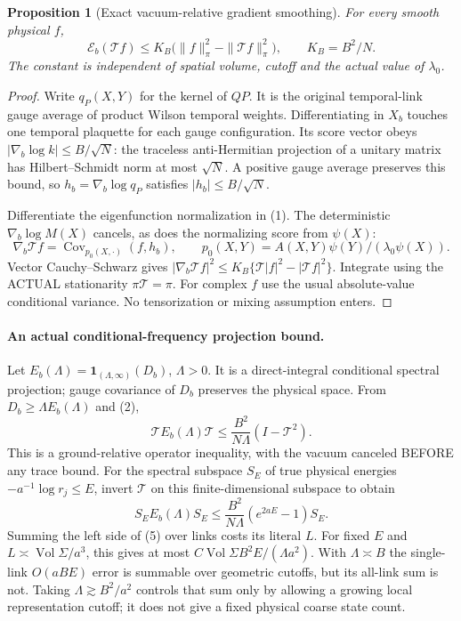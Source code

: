 \documentclass[11pt]{article}
\newtheorem{proposition}{Proposition}
\begin{document}
\begin{proposition}[Exact vacuum-relative gradient smoothing]
For every smooth physical $f$,
\[
 \mathcal E_b(\mathcal T f)
 \le K_B\big(\|f\|_\pi^2-\|\mathcal T f\|_\pi^2\big),
 \qquad K_B=B^2/N.                                    \tag{2}
\]
The constant is independent of spatial volume, cutoff and the actual value of
$\lambda_0$.
\end{proposition}
\begin{proof}
Write $q_P(X,Y)$ for the kernel of $QP$. It is the original temporal-link gauge
average of product Wilson temporal weights. Differentiating in $X_b$ touches
one temporal plaquette for each gauge configuration. Its score vector obeys
$|\nabla_b\log k|\le B/\sqrt N$: the traceless anti-Hermitian projection of a
unitary matrix has Hilbert--Schmidt norm at most $\sqrt N$.
A positive gauge average preserves this bound, so
$h_b=\nabla_b\log q_P$ satisfies $|h_b|\le B/\sqrt N$.

Differentiate the eigenfunction normalization in (1). The deterministic
$\nabla_b\log M(X)$ cancels, as does the normalizing score from $\psi(X)$:
\[
 \nabla_b\mathcal T f
 =\operatorname{Cov}_{p_0(X,\cdot)}(f,h_b),\qquad
 p_0(X,Y)=A(X,Y)\psi(Y)/(\lambda_0\psi(X)).             \tag{3}
\]
Vector Cauchy--Schwarz gives
$|\nabla_b\mathcal T f|^2\le K_B\{\mathcal T|f|^2-|\mathcal T f|^2\}$.
Integrate using the ACTUAL stationarity $\pi\mathcal T=\pi$.
For complex $f$ use the usual absolute-value conditional variance.
No tensorization or mixing assumption enters.
\end{proof}

\paragraph{An actual conditional-frequency projection bound.}
Let $E_b(\Lambda)=\boldsymbol1_{(\Lambda,\infty)}(D_b)$, $\Lambda>0$.
It is a direct-integral conditional spectral projection; gauge covariance of
$D_b$ preserves the physical space. From $D_b\ge\Lambda E_b(\Lambda)$ and (2),
\[
 \boxed{\quad
 \mathcal T E_b(\Lambda)\mathcal T
       \le\frac{B^2}{N\Lambda}(I-\mathcal T^2).
 \quad}                                               \tag{4}
\]
This is a ground-relative operator inequality, with the vacuum canceled BEFORE
any trace bound. For the spectral subspace $S_E$ of true physical energies
$-a^{-1}\log r_j\le E$, invert $\mathcal T$ on this finite-dimensional subspace
to obtain
\[
 S_E E_b(\Lambda)S_E
 \le\frac{B^2}{N\Lambda}(e^{2aE}-1)S_E.               \tag{5}
\]
Summing the left side of (5) over links costs its literal $L$. For fixed $E$
and $L\asymp\operatorname{Vol}\Sigma/a^3$, this gives at most
$C\operatorname{Vol}\Sigma B^2E/(\Lambda a^2)$. With $\Lambda\asymp B$
the single-link $O(aBE)$ error is summable over geometric cutoffs, but its
all-link sum is not. Taking $\Lambda\gtrsim B^2/a^2$ controls that sum only by
allowing a growing local representation cutoff; it does not give a fixed physical
coarse state count.
\end{document}
